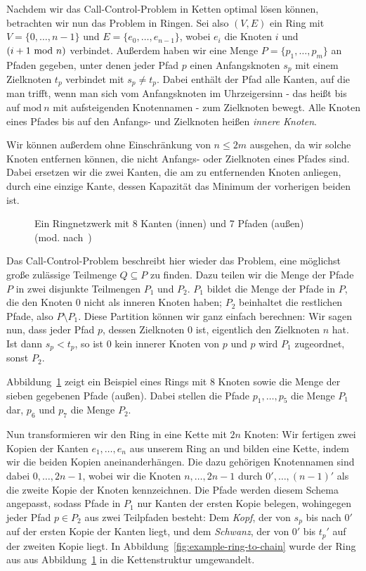 Nachdem wir das Call-Control-Problem in Ketten optimal lösen können, betrachten wir nun das Problem in Ringen.
Sei also $(V, E)$ ein Ring mit $V=\{0,\dots,n-1\}$ und $E=\{e_0, \dots, e_{n-1}\}$, wobei $e_i$ die
Knoten $i$ und $(i+1 ~\mathrm{mod}~ n)$ verbindet.
Außerdem haben wir eine Menge $P=\{p_1, \dots, p_m\}$ an Pfaden gegeben, unter denen jeder Pfad $p$ einen
Anfangsknoten $s_p$ mit einem Zielknoten $t_p$ verbindet mit $s_p \neq t_p$.
Dabei enthält der Pfad alle Kanten, auf die man trifft, wenn man sich vom Anfangsknoten im Uhrzeigersinn - das heißt
bis auf $\mathrm{mod}~n$ mit aufsteigenden Knotennamen - zum Zielknoten bewegt.
Alle Knoten eines Pfades bis auf den Anfangs- und Zielknoten heißen {\em innere Knoten}.

Wir können außerdem ohne Einschränkung von $n \leq 2m$ ausgehen, da wir solche Knoten entfernen können, die nicht
Anfangs- oder Zielknoten eines Pfades sind.
Dabei ersetzen wir die zwei Kanten, die am zu entfernenden Knoten anliegen, durch eine einzige Kante, dessen
Kapazität das Minimum der vorherigen beiden ist.

\begin{figure}[htbp]
    \centering
    \def\svgwidth{200bp}
    
    \caption{Ein Ringnetzwerk mit 8 Kanten (innen) und 7 Pfaden (außen) (mod. nach~\cite{paper})}
    \label{fig:example-ring}
\end{figure}

Das Call-Control-Problem beschreibt hier wieder das Problem, eine möglichst große zulässige Teilmenge
$Q \subseteq P$ zu finden.
Dazu teilen wir die Menge der Pfade $P$ in zwei disjunkte Teilmengen $P_1$ und $P_2$.
$P_1$ bildet die Menge der Pfade in $P$, die den Knoten $0$ nicht als inneren Knoten haben; $P_2$
beinhaltet die restlichen Pfade, also $P \setminus P_1$.
Diese Partition können wir ganz einfach berechnen:
Wir sagen nun, dass jeder Pfad $p$, dessen Zielknoten $0$ ist, eigentlich den Zielknoten $n$ hat.
Ist dann $s_p < t_p$, so ist $0$ kein innerer Knoten von $p$ und $p$ wird $P_1$ zugeordnet, sonst $P_2$.

Abbildung~\ref{fig:example-ring} zeigt ein Beispiel eines Rings mit 8 Knoten sowie die Menge der sieben gegebenen Pfade (außen).
Dabei stellen die Pfade $p_1,\dots,p_5$ die Menge $P_1$ dar, $p_6$ und $p_7$ die Menge $P_2$.


Nun transformieren wir den Ring in eine Kette mit $2n$ Knoten:
Wir fertigen zwei Kopien der Kanten $e_1,\dotsc,e_n$ aus unserem Ring an und bilden eine Kette, indem wir die
beiden Kopien aneinanderhängen.
Die dazu gehörigen Knotennamen sind dabei $0, \dotsc, 2n-1$, wobei wir die Knoten $n, \dotsc, 2n-1$ durch
$0', \dotsc, (n-1)'$ als die zweite Kopie der Knoten kennzeichnen.
Die Pfade werden diesem Schema angepasst, sodass Pfade in $P_1$ nur Kanten der ersten Kopie belegen, wohingegen
jeder Pfad $p \in P_2$ aus zwei Teilpfaden besteht: Dem {\em Kopf}, der von $s_p$ bis nach $0'$ auf der ersten
Kopie der Kanten liegt, und dem {\em Schwanz}, der von $0'$ bis $t_p '$ auf der zweiten Kopie liegt.
In Abbildung~\ref{fig:example-ring-to-chain} wurde der Ring aus aus Abbildung~\ref{fig:example-ring} in die Kettenstruktur umgewandelt.

